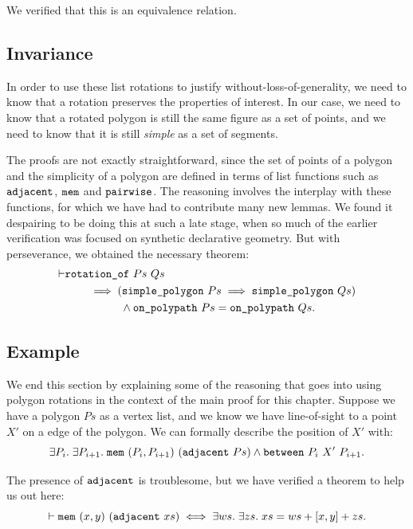 We verified that this is an equivalence relation.

\subsection{Invariance}
In order to use these list rotations to justify without-loss-of-generality, we need to know that a rotation preserves the properties of interest. In our case, we need to know that a rotated polygon is still the same figure as a set of points, and we need to know that it is still \emph{simple} as a set of segments. 

The proofs are not exactly straightforward, since the set of points of a polygon and the simplicity of a polygon are defined in terms of list functions such as $\texttt{adjacent}$, $\texttt{mem}$ and $\texttt{pairwise}$. The reasoning involves the interplay with these functions, for which we have had to contribute many new lemmas. We found it despairing to be doing this at such a late stage, when so much of the earlier verification was focused on synthetic declarative geometry. But with perseverance, we obtained the necessary theorem:
\begin{equation}\label{eq:PolygonRotateInvariant}
\begin{aligned}
\vdash      &\texttt{rotation\_of}\ Ps\ Qs\\
    &\qquad\implies (\texttt{simple\_polygon}\ Ps \implies \texttt{simple\_polygon}\ Qs)\\
    &\qquad\qquad\quad\wedge \texttt{on\_polypath}\ Ps = \texttt{on\_polypath}\ Qs.
  \end{aligned}
\end{equation}

\subsection{Example}
We end this section by explaining some of the reasoning that goes into using polygon rotations in the context of the main proof for this chapter. Suppose we have a polygon $Ps$ as a vertex list, and we know we have line-of-sight to a point $X'$ on a edge of the polygon. We can formally describe the position of $X'$ with:
\begin{displaymath}
  \exists P_i.\;\exists P_{i+1}.\; \texttt{mem}\ (P_i,P_{i+1})\ (\texttt{adjacent}\ Ps) \wedge \texttt{between}\ P_i\ X'\ P_{i+1}.
\end{displaymath}

The presence of $\texttt{adjacent}$ is troublesome, but we have verified a theorem to help us out here:
\begin{equation*}
\vdash  \texttt{mem}\ (x,y)\ (\texttt{adjacent}\ xs) \iff 
\exists ws.\;\exists zs.\; xs = ws + [x,y] + zs.
\end{equation*}

